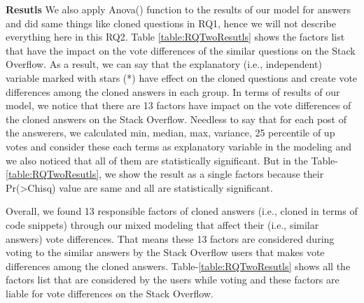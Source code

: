 \documentclass[conference]{IEEEtran}
\begin{document}
\textbf{Resutls}  We also apply Anova() function to the results of our model for answers and did same things like cloned questions in RQ1, hence we will not describe everything here in this RQ2. Table \ref{table:RQTwoResutls} shows the factors list that have the impact on the vote differences of the similar questions on the Stack Overflow. As a result, we can say that the explanatory (i.e., independent) variable marked with stars (*) have effect on the cloned questions and create vote differences among the cloned answers in each group. In terms of results of our model, we notice that there are 13 factors have impact on the vote differences of the cloned answers on the Stack Overflow. Needless to say that for each post of the answerers, we calculated min, median, max, variance, 25 percentile of up votes and consider these each terms as explanatory variable in the modeling and we also noticed that all of them are statistically significant. But in the Table-\ref{table:RQTwoResutls}, we show the result as a single factors because their Pr(\textgreater Chisq) value are same and all are statistically significant. 

Overall, we found 13 responsible factors of cloned answers (i.e., cloned in terms of code snippets) through our mixed modeling that affect their (i.e., similar answers) vote differences. That means these 13 factors are considered during voting to the similar answers by the Stack Overflow users that makes vote differences among the cloned answers. Table-\ref{table:RQTwoResutls} shows  all the factors list that are considered by the users while voting and these factors are liable for vote differences on the Stack Overflow.
\end{document}
